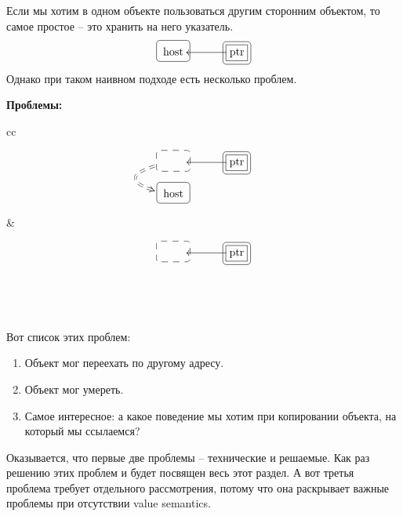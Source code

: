 Если мы хотим в одном объекте пользоваться другим сторонним объектом, то самое простое -- это хранить на него указатель.
\[
\xymatrix@R=15pt@C=15pt{
  {\text{host}}
  	{
	\save
   [].[]*+[F-:<3pt>]\frm{}
   \restore
	}
  &{}&{\text{ptr}}\ar[ll]
    	{
	\save
   [].[]*[F-]\frm{}
   \restore
	}
    	{
	\save
   [].[]*+[F-:<3pt>]\frm{}
   \restore
	}
  \\ 
}
\]
Однако при таком наивном подходе есть несколько проблем.
\begin{center}
\textbf{Проблемы:}

\vspace{0.5cm}

\begin{tabular}{cc}
{
\begin{minipage}[\baselineskip]{5.5cm}
\[
\xymatrix@R=15pt@C=15pt{
  {\phantom{host}}\ar@{==>}@/_30pt/[d]<-5pt>
  	{
	\save
   [].[]*+[F--:<3pt>]\frm{}
   \restore
	}
  &{}&{\text{ptr}}\ar[ll]
    	{
	\save
   [].[]*[F-]\frm{}
   \restore
	}
    	{
	\save
   [].[]*+[F-:<3pt>]\frm{}
   \restore
	}
  \\ 
  {\text{host}}
    	{
	\save
   [].[]*+[F-:<3pt>]\frm{}
   \restore
	}
  &{}&{}\\
}
\]
\end{minipage}
}&{
\begin{minipage}[\baselineskip]{5.5cm}
\[
\xymatrix@R=15pt@C=15pt{
  {\phantom{host}}
  	{
	\save
   [].[]*+[F--:<3pt>]\frm{}
   \restore
	}
  &{}&{\text{ptr}}\ar[ll]
    	{
	\save
   [].[]*[F-]\frm{}
   \restore
	}
    	{
	\save
   [].[]*+[F-:<3pt>]\frm{}
   \restore
	}
  \\ 
  {\phantom{host}}
  &{}&{}\\
}
\]
\end{minipage}
}\\
\end{tabular}
\end{center}
Вот список этих проблем:
\begin{enumerate}
\item Объект мог переехать по другому адресу.

\item Объект мог умереть.

\item Самое интересное: а какое поведение мы хотим при копировании объекта, на который мы ссылаемся?
\end{enumerate}
Оказывается, что первые две проблемы -- технические и решаемые.
Как раз решению этих проблем и будет посвящен весь этот раздел.
А вот третья проблема требует отдельного рассмотрения, потому что она раскрывает важные проблемы при отсутствии value semantics.

